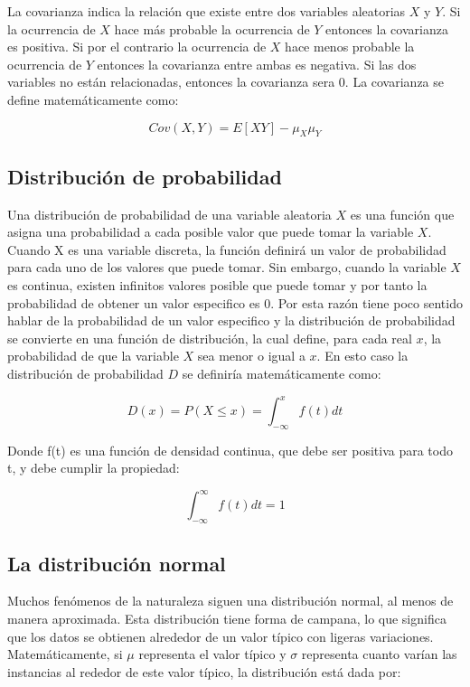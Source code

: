 \documentclass[a4paper, 11pt, oneside]{report}
\begin{document}
La covarianza indica la relación que existe entre dos variables aleatorias $X$ y $Y$. Si la ocurrencia de $X$ hace más probable la ocurrencia de $Y$ entonces la covarianza es positiva. Si por el contrario la ocurrencia de $X$ hace menos probable la ocurrencia de $Y$ entonces la covarianza entre ambas es negativa. Si las dos variables no están relacionadas, entonces la covarianza sera 0. La covarianza se define matemáticamente como:

	\[Cov(X, Y) = E[XY] - \mu_X\mu_Y\]

\subsection{Distribución de probabilidad}

Una distribución de probabilidad de una variable aleatoria $X$ es una función que asigna una probabilidad a cada posible valor que puede tomar la variable $X$. Cuando X es una variable discreta, la función definirá un valor de probabilidad para cada uno de los valores que puede tomar. Sin embargo, cuando la variable $X$ es continua, existen infinitos valores posible que puede tomar y por tanto la probabilidad de obtener un valor especifico es 0. Por esta razón tiene poco sentido hablar de la probabilidad de un valor especifico y la distribución de probabilidad se convierte en una función de distribución, la cual define, para cada real $x$, la probabilidad de que la variable $X$ sea menor o igual a $x$. En esto caso la distribución de probabilidad $D$ se definiría matemáticamente como:

	\[D(x) = P(X \leq x) = \int_{-\infty}^x{f(t)dt}\]

Donde f(t) es una función de densidad continua, que debe ser positiva para todo t, y debe cumplir la propiedad:

	\[\int_{-\infty}^{\infty}{f(t)dt} = 1\]
	
\subsection{La distribución normal}

Muchos fenómenos de la naturaleza siguen una distribución normal, al menos de manera aproximada. Esta distribución tiene forma de campana, lo que significa que los datos se obtienen alrededor de un valor típico con ligeras variaciones. Matemáticamente, si $\mu$ representa el valor típico y $\sigma$ representa cuanto varían las instancias al rededor de este valor típico, la distribución está dada por:
\end{document}
